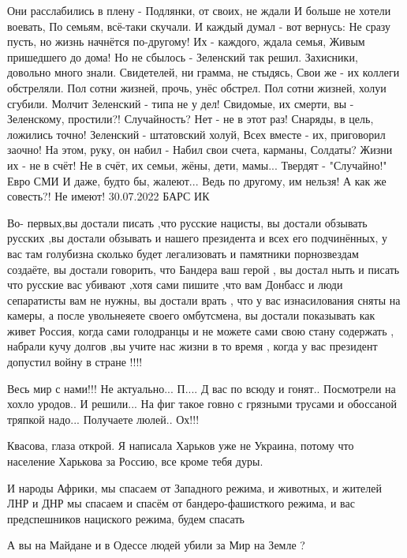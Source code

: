 Они расслабились в плену -
Подлянки, от своих, не ждали
И больше не хотели воевать,
По семьям, всё-таки скучали.
И каждый думал - вот вернусь:
Не сразу пусть, но жизнь начнётся по-другому!
Их - каждого, ждала семья,
Живым пришедшего до дома!
Но не сбылось - Зеленский так решил.
Захисники, довольно много знали.
Свидетелей, ни грамма, не стыдясь,
Свои же - их коллеги обстреляли.
Пол сотни жизней, прочь, унёс обстрел.
Пол сотни жизней, холуи сгубили.
Молчит Зеленский - типа не у дел!
Свидомые, их смерти, вы - Зеленскому, простили?!
Случайность? Нет - не в этот раз!
Снаряды, в цель, ложились точно!
Зеленский - штатовский холуй,
Всех вместе - их, приговорил заочно!
На этом, руку, он набил -
Набил свои счета, карманы,
Солдаты? Жизни их - не в счёт!
Не в счёт, их семьи, жёны, дети, мамы...
Твердят - "Случайно!" Евро СМИ
И даже, будто бы, жалеют...
Ведь по другому, им нельзя!
А как же совесть?! Не имеют!
30.07.2022 БАРС ИК

Во- первых,вы достали писать ,что русские нацисты, вы достали обзывать русских
,вы достали обзывать и нашего президента и всех его подчинённых, у вас там
голубизна сколько будет легализовать и памятники порнозвездам создаёте, вы
достали говорить, что Бандера ваш герой , вы достал ныть и писать что русские
вас убивают ,хотя сами пишите ,что вам Донбасс и люди сепаратисты вам не нужны,
вы достали врать , что у вас изнасилования сняты на камеры, а после увольнеяете
своего омбутсмена, вы достали показывать как живет Россия, когда сами
голодранцы и не можете сами свою стану содержать , набрали кучу долгов ,вы
учите нас жизни в то время , когда у вас президент допустил войну в стране !!!!

Весь мир с нами!!! Не актуально... П.... Д вас по всюду и гонят.. Посмотрели на
хохло уродов.. И решили... На фиг такое говно с грязными трусами и обоссаной
тряпкой надо... Получаете люлей.. Ох!!!

Квасова, глаза открой. Я написала Харьков уже не Украина, потому что население
Харькова за Россию, все кроме тебя дуры.


И народы Африки, мы спасаем от Западного режима, и животных, и жителей ЛНР и
ДНР мы спасаем и спасём от бандеро-фашисткого режима, и вас предспешников
нациского режима, будем спасать

А вы на Майдане и в Одессе людей убили за Мир на Земле ?

